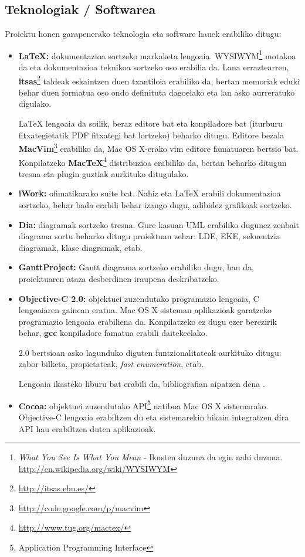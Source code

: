 \subsection{Teknologiak / Softwarea}
Proiektu honen garapenerako teknologia eta software hauek erabiliko ditugu:
\begin{itemize}
\item \textbf{\LaTeX{}:} dokumentazioa sortzeko markaketa lengoaia. WYSIWYM\footnote{\textit{What You See Is What You Mean} - Ikusten duzuna da egin nahi duzuna. \url{http://en.wikipedia.org/wiki/WYSIWYM}} motakoa da eta dokumentazioa teknikoa sortzeko oso erabilia da. Lana erraztearren, \textbf{itsas}\footnote{\url{http://itsas.ehu.es/}} taldeak eskaintzen duen txantiloia erabiliko da, bertan memoriak eduki behar duen formatua oso ondo definituta dagoelako eta lan asko aurreratuko digulako.

\LaTeX{} lengoaia da soilik, beraz editore bat eta konpiladore bat (iturburu fitxategietatik PDF fitxategi bat lortzeko) beharko ditugu. Editore bezala \textbf{MacVim}\footnote{\url{http://code.google.com/p/macvim}} erabiliko da, Mac OS X-erako vim editore famatuaren bertsio bat. Konpilatzeko \textbf{Mac\TeX}\footnote{\url{http://www.tug.org/mactex/}} distribuzioa erabiliko da, bertan beharko ditugun tresna eta plugin guztiak aurkituko ditugulako.
\item \textbf{iWork:} ofimatikarako suite bat. Nahiz eta \LaTeX{} erabili dokumentazioa sortzeko, behar bada erabili behar izango dugu, adibidez grafikoak sortzeko.
\item \textbf{Dia:} diagramak sortzeko tresna. Gure kasuan UML erabiliko dugunez zenbait diagrama sortu beharko ditugu proiektuan zehar: LDE, EKE, sekuentzia diagramak, klase diagramak, etab.
\item \textbf{GanttProject:} Gantt diagrama sortzeko erabiliko dugu, hau da, proiektuaren ataza desberdinen iraupena deskribatzeko.
\item \textbf{Objective-C 2.0:} objektuei zuzendutako programazio lengoaia, C lengoaiaren gainean eratua. Mac OS X sisteman aplikazioak garatzeko programazio lengoaia erabiliena da. Konpilatzeko ez dugu ezer berezirik behar, \textbf{gcc} konpiladore famatua erabili daitekeelako.

2.0 bertsioan asko lagunduko diguten funtzionalitateak aurkituko ditugu: zabor bilketa, propietateak, \textit{fast enumeration}, etab.

Lengoaia ikasteko liburu bat erabili da, bibliografian aipatzen dena \cite{ko:08}.
\item \textbf{Cocoa:} objektuei zuzendutako API\footnote{Application Programming Interface} natiboa Mac OS X sistemarako. Objective-C lengoaia erabiltzen du eta sistemarekin bikain integratzen dira API hau erabiltzen duten aplikazioak.


\end{itemize}
